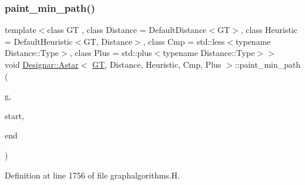 \subsubsection{\texorpdfstring{paint\+\_\+min\+\_\+path()}{paint\_min\_path()}}
{\footnotesize\ttfamily template$<$class GT , class Distance  = Default\+Distance$<$\+G\+T$>$, class Heuristic  = Default\+Heuristic$<$\+G\+T, Distance$>$, class Cmp  = std\+::less$<$typename Distance\+::\+Type$>$, class Plus  = std\+::plus$<$typename Distance\+::\+Type$>$$>$ \\
void \hyperlink{class_designar_1_1_astar}{Designar\+::\+Astar}$<$ \hyperlink{demo-buildgraph_8_c_a3001c40d2c31ca87ed96cd7d1334a55e}{GT}, Distance, Heuristic, Cmp, Plus $>$\+::paint\+\_\+min\+\_\+path (\begin{DoxyParamCaption}\item[{\hyperlink{demo-buildgraph_8_c_a3001c40d2c31ca87ed96cd7d1334a55e}{GT} \&}]{g,  }\item[{\hyperlink{class_designar_1_1_astar_a0d4cdf6b94255824c6c93e5ae18e9eb7}{Node} \&}]{start,  }\item[{\hyperlink{class_designar_1_1_astar_a0d4cdf6b94255824c6c93e5ae18e9eb7}{Node} \&}]{end }\end{DoxyParamCaption})\hspace{0.3cm}{\ttfamily [inline]}}



Definition at line 1756 of file graphalgorithms.\+H.

\mbox{\label{class_designar_1_1_astar_a23f41f4dd26aaef8ded7138de8866b54}} 
